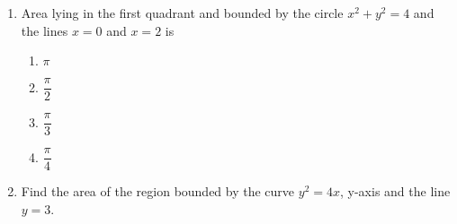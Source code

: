 \begin{enumerate} [resume]
\item Area lying in the first quadrant and bounded by the circle ${x}^2 + {y}^2 = 4$ and the lines ${x} = 0$ and ${x} = 2$ is \break
\label{chapters/12/8/1/12}
\begin{enumerate}[itemsep=+2mm]
\item $\pi$
\item $\dfrac{\pi}{2}$
\item $\dfrac{\pi}{3}$  
\item $\dfrac{\pi}{4}$
\end{enumerate}
\item Find the area of the region bounded by the curve $y^2 = 4x$, y-axis and the line $y = 3$. 
\label{chapters/12/8/1/13}
\\
\solution

\iffalse

\item 
\label{chapters/12/8/1/11}
%
\item 
\label{chapters/12/8/1/12}
%
\item Find the area of the region bounded by the curve ${y}^2 = x$ and the line ${x = 1}$, ${x} = 4$ and the x-axis in the first quadrant.
\item Find the area of the region bounded by ${y}^2
= 9{x}$, ${x} = 2$, ${x} = 4$ and the x-axis in the
first quadrant.
\item Find the area of the region in the first quadrant enclosed by x-axis, line ${x} = \sqrt{3} y$ and the circle ${x}^2 + {y}^2
 = 4$.
\item Find the area of the smaller part of the circle ${x}^2 + {y}^2 = {a}^2$ cut off by the line ${x} = \frac{a}{\sqrt{2}}$.
\item The area between ${x} = {y}^2$ and ${x} = 4$ is divided into two equal parts by the line ${x} = {a}$, find the value of ${a}$.
\item Find the area of the region bounded by the parabola ${y} = {x}^2$ and ${y} = |{x}|$.
\item Find the area bounded by the curve ${x}^2 = 4{y}$ and the line ${x} = 4{y} - 2$
	\fi

\end{enumerate}
